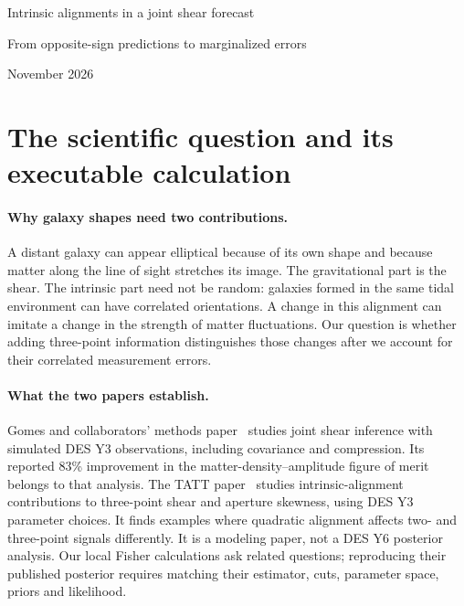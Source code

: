 \documentclass[11pt]{article}
\begin{document}
\begin{center}
{\LARGE Intrinsic alignments in a joint shear forecast\par}
\vspace{.4em}
{\large From opposite-sign predictions to marginalized errors\par}
\vspace{.6em}
{\large November 2026\par}
\end{center}

\section{The scientific question and its executable calculation}
\paragraph{Why galaxy shapes need two contributions.}
A distant galaxy can appear elliptical because of its own shape and because
matter along the line of sight stretches its image. The gravitational part
is the shear. The intrinsic part need not be random: galaxies formed in the
same tidal environment can have correlated orientations. A change in this
alignment can imitate a change in the strength of matter fluctuations.
Our question is whether adding three-point information distinguishes those
changes after we account for their correlated measurement errors.

\paragraph{What the two papers establish.}
Gomes and collaborators' methods paper~\cite{methods} studies joint shear
inference with simulated DES Y3 observations, including covariance and
compression. Its reported 83\% improvement in the matter-density--amplitude
figure of merit belongs to that analysis. The TATT paper~\cite{tatt} studies
intrinsic-alignment contributions to three-point shear and aperture
skewness, using DES Y3 parameter choices. It finds examples where quadratic
alignment affects two- and three-point signals differently. It is a modeling
paper, not a DES Y6 posterior analysis. Our local Fisher calculations ask
related questions; reproducing their published posterior requires matching
their estimator, cuts, parameter space, priors and likelihood.
\end{document}
